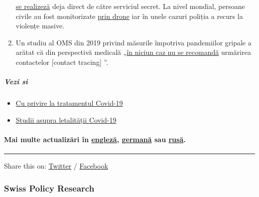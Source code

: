 \begin{enumerate}
  \href{https://www.jewishpress.com/news/the-courts/state-to-high-court-even-more-shin-bet-involvement-in-fighting-the-coronavirus/2020/04/14/}{se
  realizeză} deja direct de către serviciul secret. La nivel mondial,
  persoane civile au fost monitorizate
  \href{https://off-guardian.org/2020/04/25/50-headlines-darker-more-of-the-new-normal/}{prin
  drone} iar în unele cazuri poliția a recurs la violențe masive.
\item
  Un studiu al OMS din 2019 privind măsurile împotriva pandemiilor
  gripale a arătat că din perspectivă medicală
  „\href{https://apps.who.int/iris/bitstream/handle/10665/329438/9789241516839-eng.pdf\#page=9}{în
  niciun caz nu se recomandă} urmărirea contactelor {[}contact
  tracing{]} ''.
\end{enumerate}

\hypertarget{vezi-si}{%
\subparagraph{\texorpdfstring{\textbf{Vezi
si}}{Vezi si}}\label{vezi-si}}

\begin{itemize}
\tightlist
\item
  \href{https://swprs.org/on-the-treatment-of-covid-19/}{Cu privire la
  tratamentul Covid-19}
\item
  \href{https://swprs.org/studies-on-covid-19-lethality/}{Studii asupra
  letalității Covid-19}
\end{itemize}

\hypertarget{mai-multe-actualizux103ri-uxeen-englezux103-germanux103-sau-rusux103}{%
\paragraph{\texorpdfstring{Mai multe actualizări în
\href{https://swprs.org/a-swiss-doctor-on-covid-19/}{engleză},
\href{https://swprs.org/covid-19-hinweis-ii/}{germană} sau
\href{https://swprs.org/\%d0\%bd\%d0\%b0-\%d0\%ba\%d0\%be\%d0\%b2\%d0\%b8\%d0\%b4-19/}{rusă}.}{Mai multe actualizări în engleză, germană sau rusă.}}\label{mai-multe-actualizux103ri-uxeen-englezux103-germanux103-sau-rusux103}}

\begin{center}\rule{0.5\linewidth}{\linethickness}\end{center}

Share this on:
\href{https://twitter.com/intent/tweet?url=https://swprs.org/informatii-despre-covid-19/}{Twitter}
/
\href{https://www.facebook.com/share.php?u=https://swprs.org/informatii-despre-covid-19/}{Facebook}

\hypertarget{swiss-policy-research}{%
\subsubsection{Swiss Policy Research}\label{swiss-policy-research}}


